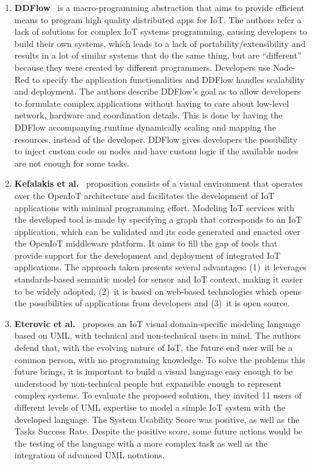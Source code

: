 \begin{enumerate}
    \item \textbf{DDFlow}~\cite{ddflow} is a macro-programming abstraction that aims to provide efficient means to program high quality distributed apps for IoT. The authors refer a lack of solutions for complex IoT systems programming, causing developers to build their own systems, which leads to a lack of portability/extensibility and results in a lot of similar systems that do the same thing, but are “different” because they were created by different programmers. Developers use Node-Red to specify the application functionalities and DDFlow handles scalability and deployment. The authors describe DDFlow's goal as to allow developers to formulate complex applications without having to care about low-level network, hardware and coordination details. This is done by having the DDFlow accompanying runtime dynamically scaling and mapping the resources, instead of the developer. DDFlow gives developers the possibility to inject custom code on nodes and have custom logic if the available nodes are not enough for some tasks.
    \item \textbf{Kefalakis et al.}~\cite{visual_paradigm_iot_solutions_development} proposition consists of a visual environment that operates over the OpenIoT architecture and facilitates the development of IoT applications with minimal programming effort. Modeling IoT services with the developed tool is made by specifying a graph that corresponds to an IoT application, which can be validated and its code generated and enacted over the OpenIoT middleware platform. It aims to fill the gap of tools that provide support for the development and deployment of integrated IoT applications. The approach taken presents several advantages: (1)~it leverages standards-based semantic model for sensor and IoT context, making it easier to be widely adopted, (2)~it is based on web-based technologies which opens the possibilities of applications from developers and (3)~it is open source. 
    \item \textbf{Eterovic et al.}~\cite{vpl_uml} proposes an IoT visual domain-specific modeling language based on UML, with technical and non-technical users in mind. The authors defend that, with the evolving nature of IoT, the future end user will be a common person, with no programming knowledge. To solve the problems this future brings, it is important to build a visual language easy enough to be understood by non-technical people but expansible enough to represent complex systems. To evaluate the proposed solution, they invited 11 users of different levels of UML expertise to model a simple IoT system with the developed language. The System Usability Score was positive, as well as the Tasks Success Rate. Despite the positive score, some future actions would be the testing of the language with a more complex task as well as the integration of advanced UML notations.

\end{enumerate}
